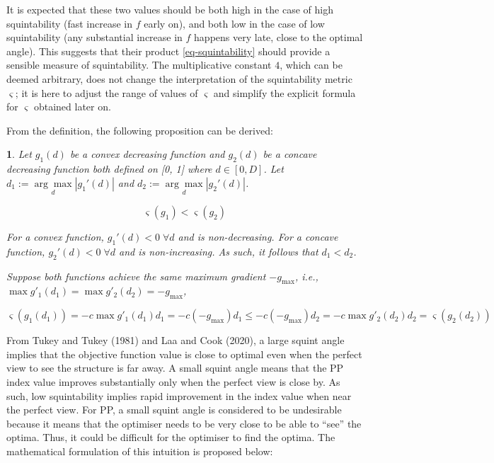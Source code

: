 \documentclass[
  12pt,
]{interact}
\theoremstyle{plain}
\newtheorem{prop}{\protect\propositionname}
\providecommand{\propositionname}{Proposition}
\begin{document}
It is expected that these two values should be both high in the case of
high squintability (fast increase in \(f\) early on), and both low in
the case of low squintability (any substantial increase in \(f\) happens
very late, close to the optimal angle). This suggests that their product
\eqref{eq-squintability} should provide a sensible measure of
squintability. The multiplicative constant \(4\), which can be deemed
arbitrary, does not change the interpretation of the squintability
metric \(\varsigma\); it is here to adjust the range of values of
\(\varsigma\) and simplify the explicit formula for \(\varsigma\)
obtained later on.

From the definition, the following proposition can be derived:

\begin{prop}\label{prop:convex-concave}
Let $g_1(d)$ be a convex decreasing function and $g_2(d)$ be a concave decreasing function both defined on [0, 1] where $d \in [0, D]$. Let $d_1 := \underset{d}{\arg \max} |g_1'(d)|$ and $d_2 := \underset{d}{\arg \max} |g_2'(d)|$.

$$\varsigma(g_1) < \varsigma(g_2)$$

For a convex function, $g_1'(d) < 0 \; \forall d$ and is non-decreasing. For a concave function, $g_2'(d) < 0 \; \forall d$ and is non-increasing. As such, it follows that $d_1 < d_2$.

Suppose both functions achieve the same maximum gradient $-g_{\max}$, i.e., $\max g'_1(d_1) = \max g'_2(d_2) = -g_{\max}$,

$$
\varsigma(g_1(d_1)) = -c  \max g'_1(d_1)  d_1 = -c  (-g_{\max}) d_1 \leq -c  (-g_{\max}) d_2 = -c \max g'_2(d_2)  d_2 = \varsigma(g_2(d_2))
$$

\end{prop}

From Tukey and Tukey (1981) and Laa and Cook (2020), a large squint
angle implies that the objective function value is close to optimal even
when the perfect view to see the structure is far away. A small squint
angle means that the PP index value improves substantially only when the
perfect view is close by. As such, low squintability implies rapid
improvement in the index value when near the perfect view. For PP, a
small squint angle is considered to be undesirable because it means that
the optimiser needs to be very close to be able to ``see'' the optima.
Thus, it could be difficult for the optimiser to find the optima. The
mathematical formulation of this intuition is proposed below:
\end{document}
